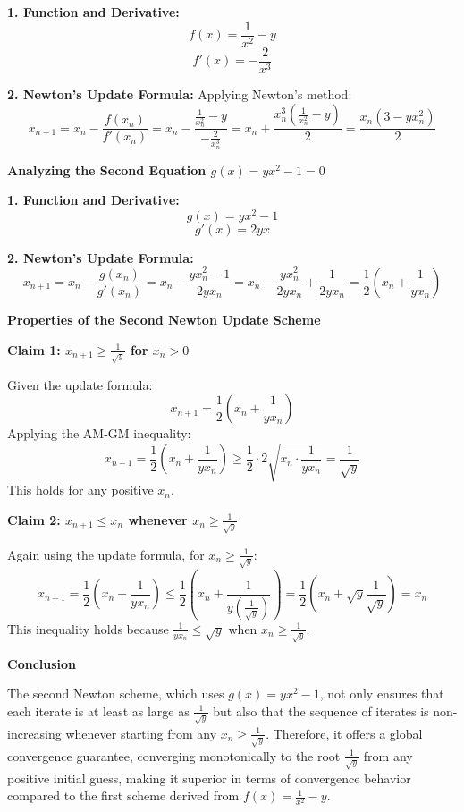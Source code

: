 \documentclass[8pt]{article}
\begin{document}
\textbf{1. Function and Derivative:}
   \[
   f(x) = \frac{1}{x^2} - y
   \]
   \[
   f'(x) = -\frac{2}{x^3}
   \]

\textbf{2. Newton's Update Formula:}
   Applying Newton's method:
   \[
   x_{n+1} = x_n - \frac{f(x_n)}{f'(x_n)} = x_n - \frac{\frac{1}{x_n^2} - y}{-\frac{2}{x_n^3}} = x_n + \frac{x_n^3(\frac{1}{x_n^2} - y)}{2} = \frac{x_n(3 - yx_n^2)}{2}
   \]

\textbf{Analyzing the Second Equation \(g(x) = yx^2 - 1 = 0\)}

\textbf{1. Function and Derivative:}
   \[
   g(x) = yx^2 - 1
   \]
   \[
   g'(x) = 2yx
   \]

\textbf{2. Newton's Update Formula:}
   \[
   x_{n+1} = x_n - \frac{g(x_n)}{g'(x_n)} = x_n - \frac{yx_n^2 - 1}{2yx_n} = x_n - \frac{yx_n^2}{2yx_n} + \frac{1}{2yx_n} = \frac{1}{2} \left(x_n + \frac{1}{yx_n}\right)
   \]

\textbf{Properties of the Second Newton Update Scheme}

\textbf{Claim 1: \(x_{n+1} \geq \frac{1}{\sqrt{y}}\) for \(x_n > 0\)}

Given the update formula:
   \[
   x_{n+1} = \frac{1}{2} \left(x_n + \frac{1}{yx_n}\right)
   \]
Applying the AM-GM inequality:
   \[
   x_{n+1} = \frac{1}{2} \left(x_n + \frac{1}{yx_n}\right) \geq \frac{1}{2} \cdot 2\sqrt{x_n \cdot \frac{1}{yx_n}} = \frac{1}{\sqrt{y}}
   \]
This holds for any positive \(x_n\).

\textbf{Claim 2: \(x_{n+1} \leq x_n\) whenever \(x_n \geq \frac{1}{\sqrt{y}}\)}

Again using the update formula, for \(x_n \geq \frac{1}{\sqrt{y}}\):
\[
x_{n+1} = \frac{1}{2} \left(x_n + \frac{1}{yx_n}\right) \leq \frac{1}{2} \left(x_n + \frac{1}{y\left(\frac{1}{\sqrt{y}}\right)}\right) = \frac{1}{2} \left(x_n + \sqrt{y}\frac{1}{\sqrt{y}}\right) = x_n
\]
This inequality holds because \(\frac{1}{yx_n} \leq \sqrt{y}\) when \(x_n \geq \frac{1}{\sqrt{y}}\).

\textbf{Conclusion}

The second Newton scheme, which uses \(g(x) = yx^2 - 1\), not only ensures that each iterate is at least as large as \(\frac{1}{\sqrt{y}}\) but also that the sequence of iterates is non-increasing whenever starting from any \(x_n \geq \frac{1}{\sqrt{y}}\). Therefore, it offers a global convergence guarantee, converging monotonically to the root \(\frac{1}{\sqrt{y}}\) from any positive initial guess, making it superior in terms of convergence behavior compared to the first scheme derived from \(f(x) = \frac{1}{x^2} - y\).
\end{document}
